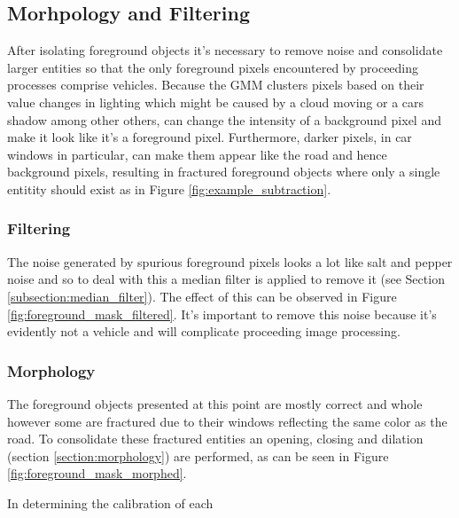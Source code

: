 \subsection{Morhpology and Filtering}

After isolating foreground objects it's necessary to remove noise and consolidate larger entities so that the only foreground pixels encountered by proceeding processes comprise vehicles. Because the GMM clusters pixels based on their value changes in lighting which might be caused by a cloud moving or a cars shadow among other others, can change the intensity of a background pixel and make it look like it's a foreground pixel. Furthermore, darker pixels, in car windows in particular, can make them appear like the road and hence background pixels, resulting in fractured foreground objects where only a single entitity should exist as in Figure \ref{fig:example_subtraction}.

\subsubsection{Filtering}

The noise generated by spurious foreground pixels looks a lot like salt and pepper noise and so to deal with this a median filter is applied to remove it (see Section \ref{subsection:median_filter}). The effect of this can be observed in Figure \ref{fig:foreground_mask_filtered}. It's important to remove this noise because it's evidently not a vehicle and will complicate proceeding image processing. 


\subsubsection{Morphology}

The foreground objects presented at this point are mostly correct and whole however some are fractured due to their windows reflecting the same color as the road. To consolidate these fractured entities an opening, closing and dilation (section \ref{section:morphology}) are performed, as can be seen in Figure \ref{fig:foreground_mask_morphed}. 

In determining the calibration of each 